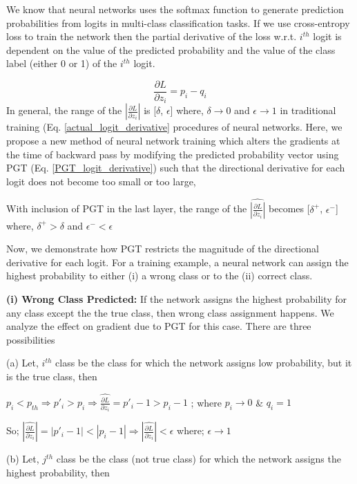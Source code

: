 \documentclass[times,sort&compress]{elsarticle}
\begin{document}
We know that neural networks uses the softmax function to generate prediction
probabilities from logits in multi-class classification tasks. If we use cross-entropy
loss to train the network then the partial derivative of the loss w.r.t. $i^{th}$ logit
is dependent on the value of the predicted probability and the value of the class label
(either 0 or 1) of the $i^{th}$ logit. 

\begin{equation}
\label{actual_logit_derivative}
\frac{\partial L}{\partial z_i} = p_i -q_i
\end{equation}
In general, the range of the $|\frac{\partial L}{\partial z_i}|$ is [$\delta$,
$\epsilon$] where, $\delta\rightarrow 0$ and $\epsilon\rightarrow 1$ in traditional
training (Eq. \ref{actual_logit_derivative} procedures of neural networks. Here, we
propose a new method of neural network training which alters the gradients at the time
of backward pass by modifying the predicted probability vector using PGT (Eq.
\ref{PGT_logit_derivative}) such that the directional derivative for each logit does not
become too small or too large,


With inclusion of PGT in the last layer, the range of the $\widehat{|\frac{\partial
L}{\partial z_i}|}$ becomes [$\delta^+$, $\epsilon^-$] where, $\delta^+>\delta$ and
$\epsilon^-<\epsilon$


Now, we demonstrate how PGT restricts the magnitude of the directional derivative for
each logit. For a training example, a neural network can assign the highest probability
to either (i) a wrong class or to the (ii) correct class. 

\textbf{(i) Wrong Class Predicted:}
If the network assigns the highest probability for any class except the the true class,
then wrong class assignment happens. We analyze the effect on gradient due to PGT for
this case. There are three possibilities

(a) Let, $i^{th}$ class be the class for which the network assigns low probability, but
it is the true class, then

$p_i < p_{th} \Rightarrow p'_i > p_i \Rightarrow \widehat{\frac{\partial L}{\partial
z_i}} = p'_i -1 >  p_i -1 $ ; where $p_i\rightarrow 0$ \& $q_i = 1$

So; $|\widehat{\frac{\partial L}{\partial z_i}}| = |p'_i -1| <  |p_i -1| \Rightarrow
|\widehat{\frac{\partial L}{\partial z_i}}| <\epsilon $ where; $\epsilon\rightarrow 1$

(b) Let, $j^{th}$ class be the class (not true class) for which the network assigns the
highest probability, then
\end{document}
